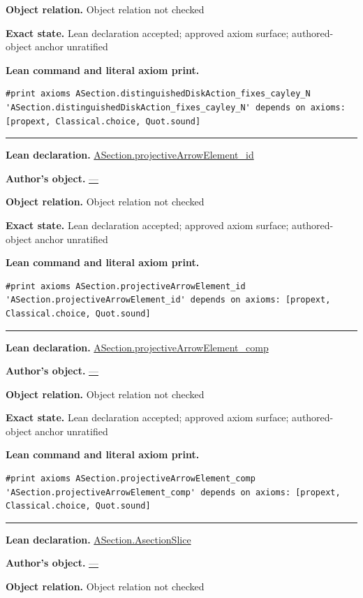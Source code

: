 \documentclass[11pt]{article}
\theoremstyle{plain}
\theoremstyle{definition}
\theoremstyle{remark}
\begin{document}
\begin{tcolorbox}
\par\textbf{Object relation.} Object relation not checked
\par\textbf{Exact state.} Lean declaration accepted; approved axiom surface; authored-object anchor unratified
\par\smallskip\textbf{Lean command and literal axiom print.}
\begin{Verbatim}[breaklines=true,breakanywhere=true,fontsize=\small]
#print axioms ASection.distinguishedDiskAction_fixes_cayley_N
'ASection.distinguishedDiskAction_fixes_cayley_N' depends on axioms: [propext, Classical.choice, Quot.sound]
\end{Verbatim}
\medskip\hrule\medskip
\textbf{Lean declaration.} \url{ASection.projectiveArrowElement_id}
\par\textbf{Author's object.} \url{—}
\par\textbf{Object relation.} Object relation not checked
\par\textbf{Exact state.} Lean declaration accepted; approved axiom surface; authored-object anchor unratified
\par\smallskip\textbf{Lean command and literal axiom print.}
\begin{Verbatim}[breaklines=true,breakanywhere=true,fontsize=\small]
#print axioms ASection.projectiveArrowElement_id
'ASection.projectiveArrowElement_id' depends on axioms: [propext, Classical.choice, Quot.sound]
\end{Verbatim}
\medskip\hrule\medskip
\textbf{Lean declaration.} \url{ASection.projectiveArrowElement_comp}
\par\textbf{Author's object.} \url{—}
\par\textbf{Object relation.} Object relation not checked
\par\textbf{Exact state.} Lean declaration accepted; approved axiom surface; authored-object anchor unratified
\par\smallskip\textbf{Lean command and literal axiom print.}
\begin{Verbatim}[breaklines=true,breakanywhere=true,fontsize=\small]
#print axioms ASection.projectiveArrowElement_comp
'ASection.projectiveArrowElement_comp' depends on axioms: [propext, Classical.choice, Quot.sound]
\end{Verbatim}
\medskip\hrule\medskip
\textbf{Lean declaration.} \url{ASection.AsectionSlice}
\par\textbf{Author's object.} \url{—}
\par\textbf{Object relation.} Object relation not checked

\end{tcolorbox}
\end{document}
